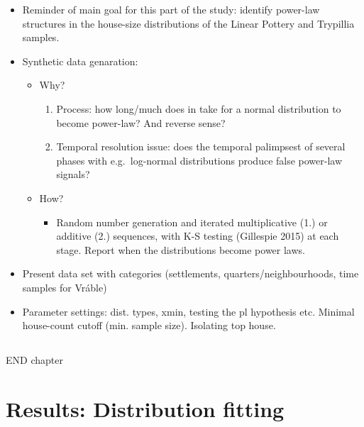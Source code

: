 \documentclass[
  12pt,
]{book}
\providecommand{\tightlist}{%
  \setlength{\itemsep}{0pt}\setlength{\parskip}{0pt}}
\begin{document}
\begin{itemize}
\item
  Reminder of main goal for this part of the study: identify power-law structures in the house-size distributions of the Linear Pottery and Trypillia samples.
\item
  Synthetic data genaration:

  \begin{itemize}
  \item
    Why?

    \begin{enumerate}
    \def\labelenumi{\arabic{enumi}.}
    \item
      Process: how long/much does in take for a normal distribution to become power-law? And reverse sense?
    \item
      Temporal resolution issue: does the temporal palimpsest of several phases with e.g.~log-normal distributions produce false power-law signals?
    \end{enumerate}
  \item
    How?

    \begin{itemize}
    \tightlist
    \item
      Random number generation and iterated multiplicative (1.) or additive (2.) sequences, with K-S testing (Gillespie 2015) at each stage. Report when the distributions become power laws.
    \end{itemize}
  \end{itemize}
\item
  Present data set with categories (settlements, quarters/neighbourhoods, time samples for Vráble)
\item
  Parameter settings: dist. types, xmin, testing the pl hypothesis etc. Minimal house-count cutoff (min. sample size). Isolating top house.
\end{itemize}

\hypertarget{section}{%
\section{}\label{section}}

END chapter

\hypertarget{results-distfit}{%
\chapter{Results: Distribution fitting}\label{results-distfit}}
\end{document}
